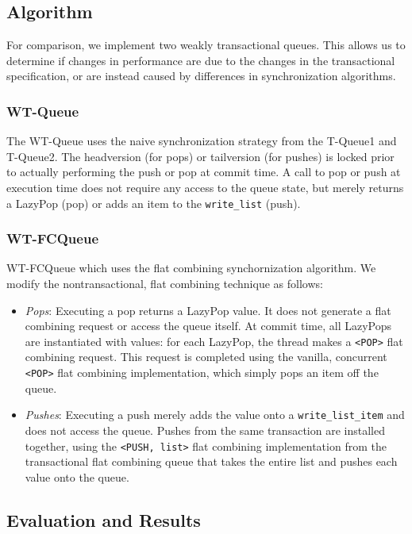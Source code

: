 \subsection{Algorithm}

For comparison, we implement two weakly transactional queues. This allows us to determine if changes in performance are due to the changes in the transactional specification, or are instead caused by differences in synchronization algorithms.

\subsubsection{WT-Queue}
The WT-Queue uses the naive synchronization strategy from the T-Queue1 and T-Queue2. The headversion (for pops) or tailversion (for pushes) is locked prior to actually performing the push or pop at commit time. A call to pop or push at execution time does not require any access to the queue state, but merely returns a LazyPop (pop) or adds an item to the \texttt{write\_list} (push).

\subsubsection{WT-FCQueue}
WT-FCQueue which uses the flat combining synchornization algorithm. We modify the nontransactional, flat combining technique as follows:
\begin{itemize}
    \item \emph{Pops}: 
    Executing a pop returns a LazyPop value. It does not generate a flat combining request or access the queue itself. At commit time, all LazyPops are instantiated with values: for each LazyPop, the thread makes a \texttt{<POP>} flat combining request. This request is completed using the vanilla, concurrent \texttt{<POP>} flat combining implementation, which simply pops an item off the queue.

    \item \emph{Pushes}: 
    Executing a push merely adds the value onto a \texttt{write\_list\_item} and does not access the queue. Pushes from the same transaction are installed together, using the \texttt{<PUSH, list>} flat combining implementation from the transactional flat combining queue that takes the entire list and pushes each value onto the queue.
\end{itemize}

\subsection{Evaluation and Results}

